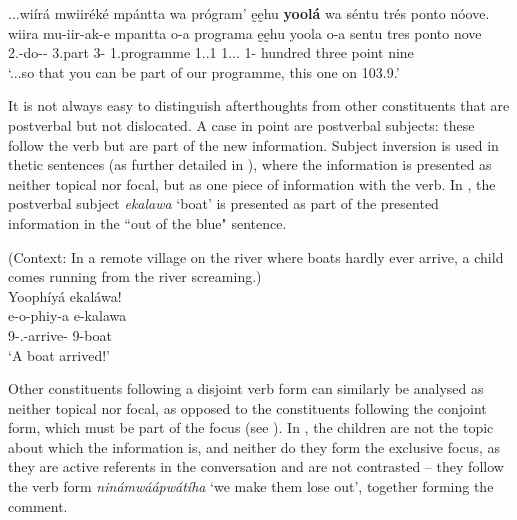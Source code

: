 \documentclass[output=paper]{langscibook}
\begin{document}
\ea
\label{bkm:Ref95914183}
...wiírá mwiiréké mpántta wa prógram’ ḛḛhu \textbf{yoolá} wa séntu trés ponto nóove.\\
\gll
wiira  mu-iir-ak-e  mpantta  o-a  programa  ḛḛhu yoola  o-a  sentu  tres  ponto  nove \\
\COMP{}  2\PL{}.\SM{}-do-\DUR{}-\SBJV{}  3.part  3-\CONN{}  1.programme  1.\POSS{}.1\PL{}  1.\E.\DEM{}.\PROX{}  1-\CONN{}  hundred  three  point  nine \\
\glt
‘...so that you can be part of our programme, this one on 103.9.’\\

\z

It is not always easy to distinguish afterthoughts from other constituents that are postverbal but not dislocated. A case in point are postverbal subjects: these follow the verb but are part of the new information. Subject inversion is used in thetic sentences (as further detailed in ), where the information is presented as neither topical nor focal, but as one piece of information with the verb. In , the postverbal subject \textit{ekalawa} ‘boat’ is presented as part of the presented information in the ``out of the blue" sentence.

\ea
\label{bkm:Ref95915123}
(Context: In a remote village on the river where boats hardly ever arrive, a child comes running from the river screaming.)\\
Yoophíyá ekaláwa!\\
\gll
e-o-phiy-a  e-kalawa\\
9\SM{}-\PFV{}.\DJ{}-arrive-\FV{}  9-boat\\
\glt
‘A boat arrived!’\\


\z

Other constituents following a disjoint verb form can similarly be analysed as neither topical nor focal, as opposed to the constituents following the conjoint form, which must be part of the focus (see ). In , the children are not the topic about which the information is, and neither do they form the exclusive focus, as they are active referents in the conversation and are not contrasted – they follow the \DJ{} verb form \textit{ninámwáápwátíha} ‘we make them lose out’, together forming the comment.
\pagebreak
\end{document}
